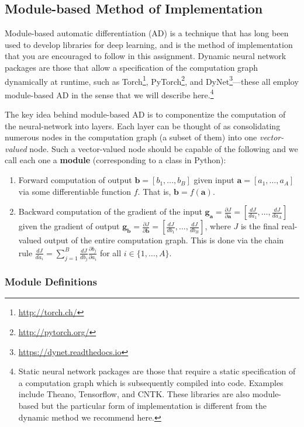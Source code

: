 \documentclass[11pt,addpoints,answers]{exam}
\newcommand{\adj}[1]{\frac{d J}{d #1}}
\newcommand{\av}{\mathbf{a}}
\newcommand{\bv}{\mathbf{b}}
\newcommand{\gv}{\mathbf{g}}
\begin{document}
\subsection{Module-based Method of Implementation}
\label{sec:modulebased}

Module-based automatic differentiation (AD) is a technique that has long been used to develop libraries for deep learning, and is the method of implementation that you are encouraged to follow in this assignment. Dynamic neural network packages are those that allow a specification of the computation graph dynamically at runtime, such as Torch\footnote{\url{http://torch.ch/}}, PyTorch\footnote{\url{http://pytorch.org/}}, and DyNet\footnote{\url{https://dynet.readthedocs.io}}---these all employ module-based AD in the sense that we will describe here.\footnote{Static neural network packages are those that require a static specification of a computation graph which is subsequently compiled into code. Examples include Theano, Tensorflow, and CNTK. These libraries are also module-based but the particular form of implementation is different from the dynamic method we recommend here.}

The key idea behind module-based AD is to componentize the computation of the neural-network into layers. Each layer can be thought of as consolidating numerous nodes in the computation graph (a subset of them) into one \emph{vector-valued} node. Such a vector-valued node should be capable of the following and we call each one a {\bf module} (corresponding to a class in Python):
\begin{enumerate}
    \item Forward computation of output $\bv = [b_1, \ldots, b_B]$ given input $\av = [a_1, \ldots, a_A]$ via some differentiable function $f$. That is, $\bv = f(\av)$. 
    \item Backward computation of the gradient of the input $\gv_{\av} = \frac{\partial J}{\partial \av} = [\adj{a_1}, \ldots, \adj{a_A}]$ given the gradient of output $\gv_{\bv} = \frac{\partial J}{\partial \bv} = [\adj{b_1}, \ldots, \adj{b_B}]$, where $J$ is the final real-valued output of the entire computation graph. This is done via the chain rule $\adj{a_i} = \sum_{j=1}^B \adj{b_j} \frac{\partial  b_j}{\partial  a_i}$ for all $i \in \{1, \ldots, A\}$.
\end{enumerate}

\subsubsection{Module Definitions}
\end{document}

